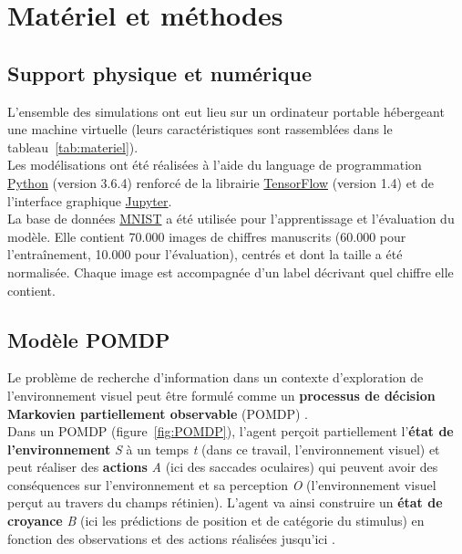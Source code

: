 
\chapter{Matériel et méthodes} %
\label{Materiel_methode} %


\section{Support physique et numérique} %
L'ensemble des simulations ont eut lieu sur un ordinateur portable hébergeant une machine virtuelle (leurs caractéristiques sont rassemblées dans le tableau~\ref{tab:materiel}).\\
Les modélisations ont été réalisées à l'aide du language de programmation \href{https://www.python.org/}{Python} (version 3.6.4) renforcé de la librairie \href{https://www.tensorflow.org/}{TensorFlow} (version 1.4) et de l'interface graphique \href{https://jupyter.org/}{Jupyter}.\\
La base de données \href{http://yann.lecun.com/exdb/mnist/}{MNIST} a été utilisée pour l'apprentissage et l'évaluation du modèle. Elle contient 70.000 images de chiffres manuscrits (60.000 pour l'entraînement, 10.000 pour l'évaluation), centrés et dont la taille a été normalisée. Chaque image est accompagnée d'un label décrivant quel chiffre elle contient.


\section{Modèle POMDP} %
Le problème de recherche d'information dans un contexte d'exploration de l'environnement visuel peut être formulé comme un \textbf{processus de décision Markovien partiellement observable} (POMDP) \autocite{Butko2010}. \\
Dans un POMDP (figure~\ref{fig:POMDP}), l'agent perçoit partiellement l'\textbf{état de l'environnement} \textit{S} à un temps \textit{t} (dans ce travail, l'environnement visuel) et peut réaliser des \textbf{actions} \textit{A} (ici des saccades oculaires) qui peuvent avoir des conséquences sur l'environnement et sa perception \textit{O} (l'environnement visuel perçut au travers du champs rétinien). L'agent va ainsi construire un \textbf{état de croyance} \textit{B} (ici les prédictions de position et de catégorie du stimulus) en fonction des observations et des actions réalisées jusqu'ici \autocite{Butko2010}.

